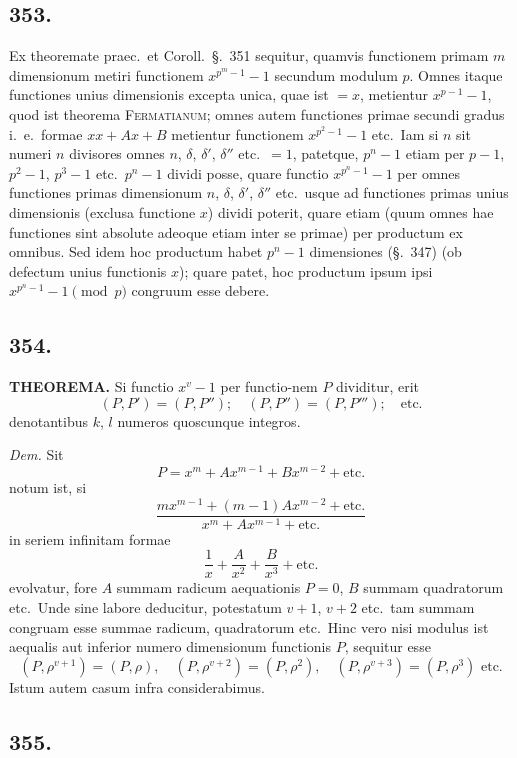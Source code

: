 \documentclass[12pt,a4paper]{article}
\newcommand{\Sec}{\S}
\begin{document}
\subsection*{353.}

Ex theoremate praec.~et Coroll.~\Sec.~351 sequitur, quamvis functionem primam $m$ dimensionum metiri functionem $x^{p^m-1}-1$ secundum modulum $p$. Omnes itaque functiones unius dimensionis excepta unica, quae ist $=x$, metientur $x^{p-1}-1$, quod ist theorema \textsc{Fermatianum}; omnes autem functiones primae secundi gradus i.~e.~formae $xx+Ax+B$ metientur functionem $x^{p^2-1}-1$ etc.~Iam si $n$ sit numeri $n$ divisores omnes $n$, $\delta$, $\delta'$, $\delta''$ etc.~$=1$, patetque, $p^n-1$ etiam per $p-1$, $p^2-1$, $p^3-1$ etc.~$p^n-1$ dividi posse, quare functio $x^{p^n-1}-1$ per omnes functiones primas dimensionum $n$, $\delta$, $\delta'$, $\delta''$ etc.~usque ad functiones primas unius dimensionis (exclusa functione $x$) dividi poterit, quare etiam (quum omnes hae functiones sint absolute adeoque etiam inter se primae) per productum ex omnibus. Sed idem hoc productum habet $p^n-1$ dimensiones (\Sec.~347) (ob defectum unius functionis $x$); quare patet, hoc productum ipsum ipsi $x^{p^n-1}-1\pmod{p}$ congruum esse debere.

\subsection*{354.}

\textbf{THEOREMA.} Si functio $x^v-1$ per functio-nem $P$ dividitur, erit
\[
(P,P')=(P,P'');\quad (P,P'')=(P,P''');\quad \text{etc.}
\]
denotantibus $k$, $l$ numeros quoscunque integros.

\textit{Dem.} Sit
\[
P = x^m + Ax^{m-1} + Bx^{m-2} + \text{etc.}
\]
notum ist, si
\[
\frac{mx^{m-1}+(m-1)Ax^{m-2}+\text{etc.}}{x^m+Ax^{m-1}+\text{etc.}}
\]
in seriem infinitam formae
\[
\frac{1}{x}+\frac{A}{x^2}+\frac{B}{x^3}+\text{etc.}
\]
evolvatur, fore $A$ summam radicum aequationis $P=0$, $B$ summam quadratorum etc.~Unde sine labore deducitur, potestatum $v+1$, $v+2$ etc.~tam summam congruam esse summae radicum, quadratorum etc.~Hinc vero nisi modulus ist aequalis aut inferior numero dimensionum functionis $P$, sequitur esse
\[
(P,\rho^{v+1})=(P,\rho),\quad (P,\rho^{v+2})=(P,\rho^2),\quad (P,\rho^{v+3})=(P,\rho^3) \text{ etc.}
\]
Istum autem casum infra considerabimus.

\subsection*{355.}
\end{document}
